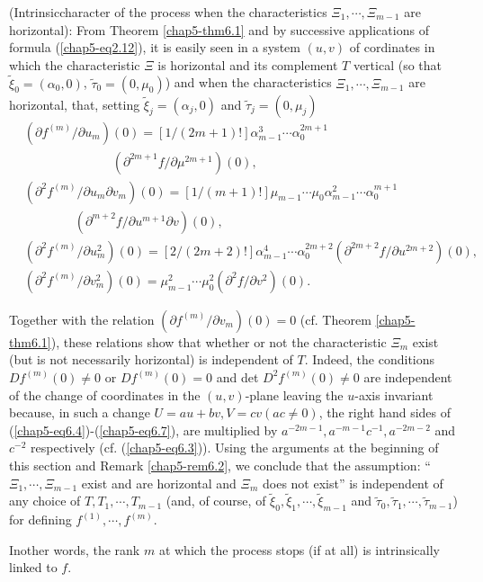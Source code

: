 \begin{remark}\label{chap5-rem6.3}
(Intrinsic\pageoriginale character of the process when the
  characteristics $\Xi_{1}, \cdots, \Xi_{m-1}$ are horizontal): From
  Theorem \ref{chap5-thm6.1} and by successive applications of formula
  (\ref{chap5-eq2.12}), it is easily seen in a system $(u, v)$ of
  cordinates in which the characteristic $\Xi$ is horizontal and its
  complement $T$ vertical (so that $\widetilde{\xi}_{0} = (\alpha_{0},
  0)$, $\widetilde{\tau}_{0} = (0, \mu_{0})$) and when the
  characteristics $\Xi_{1}, \cdots, \Xi_{m-1}$ are horizontal, that,
  setting $\widetilde{\xi}_{j} = (\alpha_{j}, 0)$ and
  $\widetilde{\tau}_{j} = (0, \mu_{j})$
\begin{align*}
&(\partial f^{(m)}/\partial u_{m})(0) = [1 / (2m+1)!]
  \alpha_{m-1}^{3} \cdots \alpha_{0}^{2m+1}\\ 
&\qquad\quad\qquad\qquad (\partial^{2m+1}f/\partial\mu^{2m+1})(0),\tag{6.4}\label{chap5-eq6.4}\\
& (\partial^{2}f^{(m)}/\partial u_{m} \partial v_{m})(0) = [1/ (m+1)!]
  \mu_{m-1} \cdots \mu_{0} \alpha_{m-1}^{2} \cdots \alpha_{0}^{m+1}\\
&\qquad\qquad (\partial^{m+2}f/\partial u^{m+1} \partial v)(0),\tag{6.5}\label{chap5-eq6.5}\\
& (\partial^{2}f^{(m)}/\partial u_{m}^{2})(0) = [2/(2m+2)!]
  \alpha_{m-1}^{4} \cdots \alpha_{0}^{2m+2} (\partial^{2m+2}f/
  \partial u^{2m+2})(0),\tag{6.6}\label{chap5-eq6.6}\\
& (\partial^{2}f^{(m)}/\partial v_{m}^{2})(0) = \mu_{m-1}^{2} \cdots
  \mu_{0}^{2}(\partial^{2}f/ \partial v^{2}) (0).\tag{6.7}\label{chap5-eq6.7}
\end{align*}

Together with the relation $(\partial f^{(m)}/ \partial v_{m})(0) = 0$
(cf. Theorem \ref{chap5-thm6.1}), these relations show that whether or
not the characteristic $\Xi_{m}$ exist (but is not necessarily
horizontal) is independent of $T$. Indeed, the conditions $Df^{(m)}(0)
\neq 0$ or $Df^{(m)} (0) = 0$ and det $D^{2}f^{(m)} (0) \neq 0$ are
independent of the change of coordinates in the $(u, v)$-plane leaving
the $u$-axis invariant because, in such a change $U = au + bv, V = cv
(ac \neq 0)$, the right hand sides of
(\ref{chap5-eq6.4})-(\ref{chap5-eq6.7}), are multiplied by $a^{-2m-1},
a^{-m-1}c^{-1}, a^{-2m-2}$ and $c^{-2}$ respectively
(cf. (\ref{chap5-eq6.3})). Using the arguments at the beginning of
this section and Remark \ref{chap5-rem6.2}, we conclude that the
assumption: ``$\Xi_{1}, \cdots, \Xi_{m-1}$ exist and are horizontal
and $\Xi_{m}$ does not exist'' is independent of any choice of $T,
T_{1}, \cdots, T_{m-1}$ (and, of course, of $\widetilde{\xi}_{0},
\widetilde{\xi}_{1}, \cdots, \widetilde{\xi}_{m-1}$ and
$\widetilde{\tau}_{0}, \widetilde{\tau}_{1}, \cdots,
\widetilde{\tau}_{m-1}$) for defining $f^{(1)}, \cdots, f^{(m)}$.

In\pageoriginale other words, the rank $m$ at which the process stops
(if at all) is intrinsically linked to $f$.
\end{remark}

